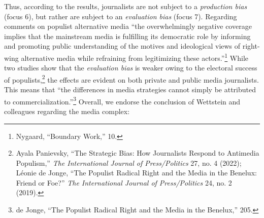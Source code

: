 \documentclass{tufte-handout}
\begin{document}
{{Thus, according to the results, journalists are not subject to a
\emph{production bias} (focus 6), but rather are subject to an
\emph{evaluation bias} (focus 7). Regarding comments on populist
alternative media ``the overwhelmingly negative coverage implies that
the mainstream media is fulfilling its democratic role by informing and
promoting public understanding of the motives and ideological views of
right-wing alternative media while refraining from legitimizing these
actors.''\footnote{Nygaard, ``Boundary Work,'' 10.} While two studies
show that the \emph{evaluation bias} is weaker owing to the electoral
success of populists,\footnote{Ayala Panievsky, ``The Strategic Bias:
  How Journalists Respond to Antimedia Populism,'' \emph{The
  International Journal of Press/Politics} 27, no. 4 (2022); Léonie de
  Jonge, ``The Populist Radical Right and the Media in the Benelux:
  Friend or Foe?'' \emph{The International Journal of Press/Politics}
  24, no. 2 (2019).} the effects are evident on both private and public
media journalists. This means that ``the differences in media strategies
cannot simply be attributed to commercialization.''\footnote{de Jonge,
  ``The Populist Radical Right and the Media in the Benelux,'' 205.}
Overall, we endorse the conclusion of Wettstein and colleagues regarding
the media complex:

}}
\end{document}
